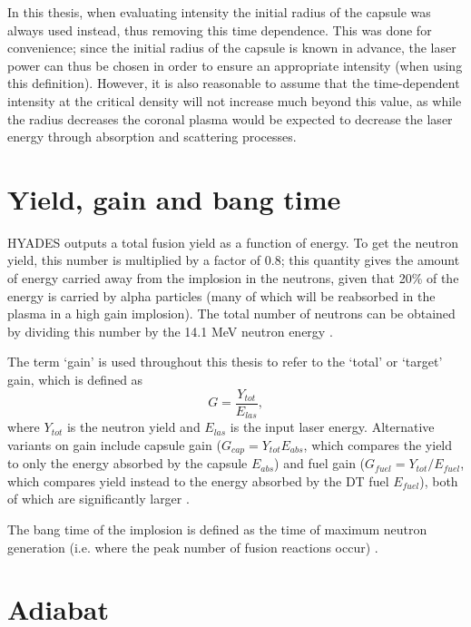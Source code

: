 In this thesis, when evaluating intensity the initial radius of the capsule was always used instead, thus removing this time dependence. This was done for convenience; since the initial radius of the capsule is known in advance, the laser power can thus be chosen in order to ensure an appropriate intensity (when using this definition). However, it is also reasonable to assume that the time-dependent intensity at the critical density will not increase much beyond this value, as while the radius decreases the coronal plasma would be expected to decrease the laser energy through absorption and scattering processes.

\section{Yield, gain and bang time}

HYADES outputs a total fusion yield as a function of energy. To get the neutron yield, this number is multiplied by a factor of 0.8; this quantity gives the amount of energy carried away from the implosion in the neutrons, given that 20\% of the energy is carried by alpha particles (many of which will be reabsorbed in the plasma in a high gain implosion). The total number of neutrons can be obtained by dividing this number by the 14.1 MeV neutron energy \cite{Atzeni2008}.

The term `gain' is used throughout this thesis to refer to the `total' or `target' gain, which is defined as \begin{equation} G = \frac{Y_{tot}}{E_{las}}, \end{equation} where $Y_{tot}$ is the neutron yield and $E_{las}$ is the input laser energy. Alternative variants on gain include capsule gain ($G_{cap} = Y_{tot}E_{abs}$, which compares the yield to only the energy absorbed by the capsule $E_{abs}$) and fuel gain ($G_{fuel} = Y_{tot} / E_{fuel}$, which compares yield instead to the energy absorbed by the DT fuel $E_{fuel}$), both of which are significantly larger \cite{Atzeni2008, Abu-Shawareb2022}.

The bang time of the implosion is defined as the time of maximum neutron generation (i.e. where the peak number of fusion reactions occur) \cite{Craxton2015}.

\section{Adiabat}

